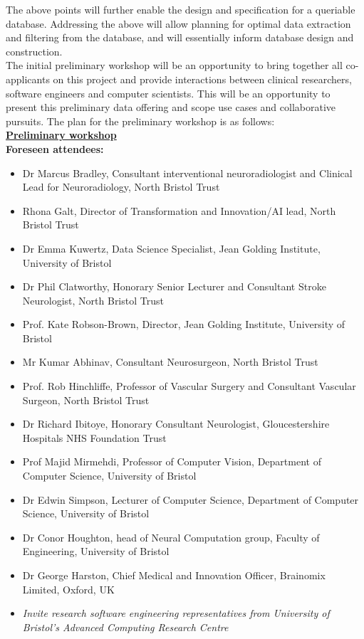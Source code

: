 \documentclass{article}
\begin{document}
The above points will further enable the design and specification for
a queriable database. Addressing the above will allow planning for
optimal data extraction and filtering from the database, and will
essentially inform database design and construction.\\

The initial preliminary workshop will be an opportunity to bring
together all co-applicants on this project and provide interactions
between clinical researchers, software engineers and computer
scientists. This will be an opportunity to present this preliminary
data offering and scope use cases and collaborative pursuits. The plan
for the preliminary workshop is as follows:\\

\noindent\textbf{\underline{Preliminary workshop}}\\

\textbf{Foreseen attendees:}
\begin{itemize}
\item Dr Marcus Bradley, Consultant interventional neuroradiologist
  and Clinical Lead for Neuroradiology, North Bristol Trust
\item Rhona Galt, Director of Transformation and Innovation/AI lead,
  North Bristol Trust
\item Dr Emma Kuwertz, Data Science Specialist, Jean Golding
  Institute, University of Bristol
\item Dr Phil Clatworthy, Honorary Senior Lecturer and
  Consultant Stroke Neurologist, North Bristol Trust
\item Prof. Kate Robson-Brown, Director, Jean Golding
  Institute, University of Bristol
\item Mr Kumar Abhinav, Consultant Neurosurgeon, North Bristol Trust
\item Prof. Rob Hinchliffe, Professor of Vascular Surgery and
  Consultant Vascular Surgeon, North Bristol Trust
\item Dr Richard Ibitoye, Honorary Consultant Neurologist,
  Gloucestershire Hospitals NHS Foundation Trust
\item Prof Majid Mirmehdi, Professor of Computer Vision, Department of
  Computer Science, University of Bristol
\item Dr Edwin Simpson, Lecturer of Computer Science, Department of
  Computer Science, University of Bristol
\item Dr Conor Houghton, head of Neural Computation group, Faculty
  of Engineering, University of Bristol
\item Dr George Harston, Chief Medical and Innovation Officer,
  Brainomix Limited, Oxford, UK
\item \textit{Invite research software engineering representatives from
    University of Bristol's Advanced Computing Research Centre}
\end{itemize}
\end{document}
